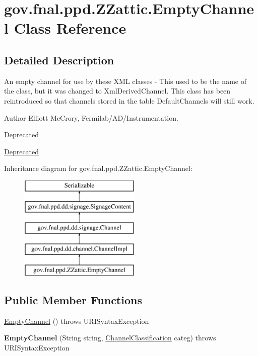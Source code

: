 \hypertarget{classgov_1_1fnal_1_1ppd_1_1ZZattic_1_1EmptyChannel}{\section{gov.\-fnal.\-ppd.\-Z\-Zattic.\-Empty\-Channel Class Reference}
\label{classgov_1_1fnal_1_1ppd_1_1ZZattic_1_1EmptyChannel}
}


\subsection{Detailed Description}
An empty channel for use by these X\-M\-L classes -\/ This used to be the name of the class, but it was changed to Xml\-Derived\-Channel. This class has been reintroduced so that channels stored in the table Default\-Channels will still work.

\begin{DoxyAuthor}{Author}
Elliott Mc\-Crory, Fermilab/\-A\-D/\-Instrumentation.
\end{DoxyAuthor}
\begin{DoxyRefDesc}{Deprecated}
\item[\hyperlink{deprecated__deprecated000012}{Deprecated}]\end{DoxyRefDesc}
Inheritance diagram for gov.\-fnal.\-ppd.\-Z\-Zattic.\-Empty\-Channel\-:\begin{figure}[H]
\begin{center}
\leavevmode
\includegraphics[height=5.000000cm]{classgov_1_1fnal_1_1ppd_1_1ZZattic_1_1EmptyChannel}
\end{center}
\end{figure}
\subsection*{Public Member Functions}
\begin{DoxyCompactItemize}
\item 
\hyperlink{classgov_1_1fnal_1_1ppd_1_1ZZattic_1_1EmptyChannel_a4a6583a1af231f1b744f301b4fd5a189}{Empty\-Channel} ()  throws U\-R\-I\-Syntax\-Exception 
\item 
\hypertarget{classgov_1_1fnal_1_1ppd_1_1ZZattic_1_1EmptyChannel_a0cf129fc587da4f9267aff97fbe33633}{{\bfseries Empty\-Channel} (String string, \hyperlink{classgov_1_1fnal_1_1ppd_1_1dd_1_1changer_1_1ChannelClassification}{Channel\-Classification} categ)  throws U\-R\-I\-Syntax\-Exception }\label{classgov_1_1fnal_1_1ppd_1_1ZZattic_1_1EmptyChannel_a0cf129fc587da4f9267aff97fbe33633}

\end{DoxyCompactItemize}
